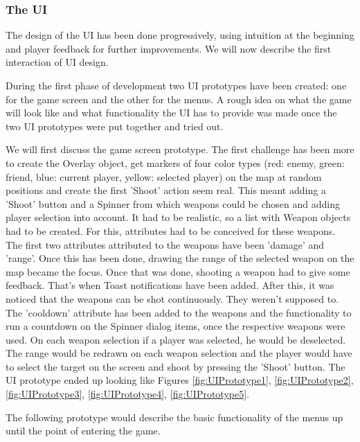 \subsubsection{The UI}

The design of the UI has been done progressively, using intuition at the
beginning and player feedback for further improvements. We will now describe the
first interaction of UI design.\newline

During the first phase of development two UI prototypes have been created: one
for the game screen and the other for the menus. A rough idea on what the game
will look like and what functionality the UI has to provide was made once the
two UI prototypes were put together and tried out.\newline

We will first discuss the game screen prototype. The first challenge has been
more to create the Overlay object, get markers of four color types (red: enemy,
green: friend, blue: current player, yellow: selected player) on the map at
random positions and create the first 'Shoot' action seem real. This meant
adding a 'Shoot' button and a Spinner from which weapons could be chosen and
adding player selection into account. It had to be realistic, so a list with
Weapon objects had to be created. For this, attributes had to be conceived for
these weapons. The first two attributes attributed to the weapons have
been 'damage' and 'range'. Once this has been done, drawing the range of the
selected weapon on the map became the focus. Once that was done, shooting a
weapon had to give some feedback. That's when Toast notifications have been
added. After this, it was noticed that the weapons can be shot continuously.
They weren't supposed to. The 'cooldown' attribute has been added to the
weapons and the functionality to run a countdown on the Spinner dialog items,
once the respective weapons were used. On each weapon selection if a player was
selected, he would be deselected. The range would be redrawn on each weapon
selection and the player would have to select the target on the screen and shoot
by pressing the 'Shoot' button. The UI prototype ended up looking like Figures
\ref{fig:UIPrototype1}, \ref{fig:UIPrototype2}, \ref{fig:UIPrototype3}, \ref{fig:UIPrototype4}, \ref{fig:UIPrototype5}.\newline

The following prototype would describe the basic functionality of the menus up
until the point of entering the game.\newline



